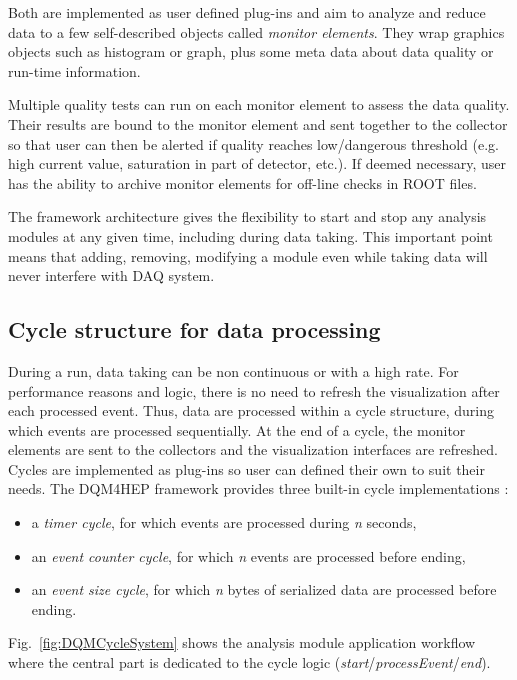 \documentclass[journal]{IEEEtran}
\begin{document}
Both are implemented as user defined plug-ins and aim to analyze and reduce data to a few self-described objects called \emph{monitor elements}. They wrap graphics objects such as histogram or graph, plus some meta data about data quality or run-time information.

Multiple quality tests can run on each monitor element to assess the data quality. Their results are bound to the monitor element and sent together to the collector so that user can then be alerted if quality reaches low/dangerous threshold (e.g. high current value, saturation in part of detector, etc.). If deemed necessary, user has the ability to archive monitor elements for off-line checks in ROOT \cite{ROOT} files.

The framework architecture gives the flexibility to start and stop any analysis modules at any given time, including during data taking. This important point means that adding, removing, modifying a module even while taking data will never interfere with DAQ system.

\subsection{Cycle structure for data processing}

During a run, data taking can be non continuous or with a high rate. For performance reasons and logic, there is no need to refresh the visualization after each processed event. Thus, data are processed within a cycle structure, during which events are processed sequentially. At the end of a cycle, the monitor elements are sent to the collectors and the visualization interfaces are refreshed. Cycles are implemented as plug-ins so user can defined their own to suit their needs. The DQM4HEP framework provides three built-in cycle implementations :

\begin{itemize}
  \item a \textit{timer cycle}, for which events are processed during \textit{n} seconds,
  \item an \textit{event counter cycle}, for which \textit{n} events are processed before ending,
  \item an \textit{event size cycle}, for which \textit{n} bytes of serialized data are processed before ending.
\end{itemize}

Fig.~\ref{fig:DQMCycleSystem} shows the analysis module application workflow where the central part is dedicated to the cycle logic (\textit{start}/\textit{processEvent}/\textit{end}).
\end{document}
